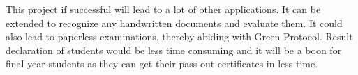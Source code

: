 This project if successful will lead to a lot of other applications. It can be extended to
recognize any handwritten documents and evaluate them. It could also lead to paperless
examinations, thereby abiding with Green Protocol. Result declaration of students would be
less time consuming and it will be a boon for final year students as they can get their pass out
certificates in less time. 